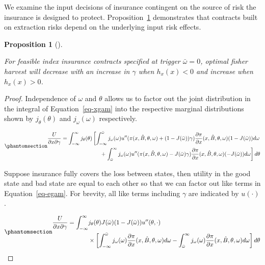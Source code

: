 \documentclass[
  letterpaper,
  DIV=11,
  numbers=noendperiod]{scrartcl}
\theoremstyle{plain}
\theoremstyle{plain}
\newtheorem{proposition}{Proposition}[section]
\theoremstyle{remark}
\begin{document}
We examine the input decisions of insurance contingent on the source of
risk the insurance is designed to protect. Proposition~\ref{prp-ind}
demonstrates that contracts built on extraction risks depend on the
underlying input risk effects.

\begin{proposition}[]\protect\hypertarget{prp-ind}{}\label{prp-ind}

For feasible index insurance contracts specified at trigger
\(\bar\omega=0\), optimal fisher harvest will decrease with an increase
in \(\gamma\) when \(h_x(x)<0\) and increase when \(h_x(x)>0\).

\end{proposition}

\begin{proof}
Independence of \(\omega\) and \(\theta\) allows us to factor out the
joint distribution in the integral of Equation~\ref{eq-xgam} into the
respective marginal distributions shown by \(j_\theta(\theta)\) and
\(j_\omega(\omega)\) respectively.

\begin{equation}\phantomsection\label{eq-egam}{
\begin{aligned}
\frac{U}{\partial x \partial \gamma}=\int^{\infty}_{-\infty}j_{\theta}(\theta)\left[ \int^{\bar\omega}_{-\infty}j_{\omega}(\omega)u''(\pi(x,\hat{B},\theta,\omega)+(1-J(\bar\omega))\gamma)\frac{\partial \pi}{\partial x}(x,\hat{B},\theta,\omega)(1-J(\bar\omega))d\omega\right.\\
+\left.\int^{\infty}_{\bar{\omega}}j_{\omega}(\omega) u''(\pi(x,\hat{B},\theta,\omega)-J(\bar\omega)\gamma)\frac{\partial \pi}{\partial x}(x,\hat{B},\theta,\omega)(-J(\bar\omega))d\omega\right] d\theta
\end{aligned}
}\end{equation}

Suppose insurance fully covers the loss between states, then utility in
the good state and bad state are equal to each other so that we can
factor out like terms in Equation~\ref{eq-egam}. For brevity, all like
terms including \(\gamma\) are indicated by \(u(\cdot)\).

\begin{equation}\phantomsection\label{eq-simp}{
\begin{aligned}
\frac{U}{\partial x \partial \gamma}=\int^{\infty}_{-\infty}&j_{\theta}(\theta)J(\bar\omega)(1-J(\bar\omega))u''(\theta,\cdot)\\
&\times\left[ \int^{\bar\omega}_{-\infty}j_{\omega}(\omega)\frac{\partial \pi}{\partial x}(x,\hat{B},\theta,\omega)d\omega
-\int^{\infty}_{\bar{\omega}}j_{\omega}(\omega)\frac{\partial \pi}{\partial x}(x,\hat{B},\theta,\omega)d\omega\right] d\theta
\end{aligned}
}\end{equation}


\end{proof}
\end{document}
